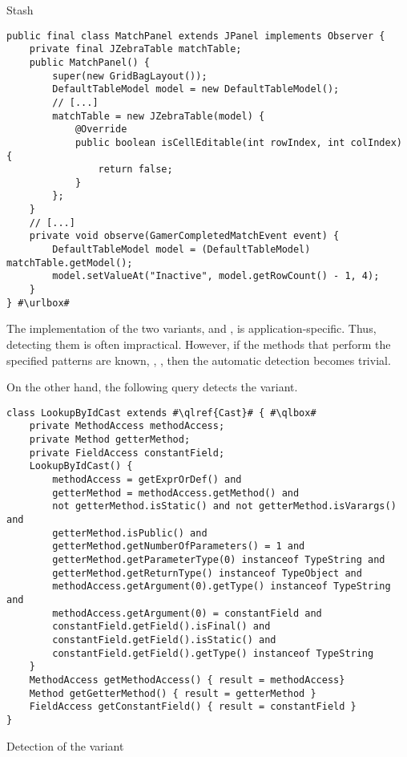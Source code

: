 \begin{pattern}{Stash}
\def\urlvar{http://bit.ly/ggp_org_ggp_base_2SAEXHu}
\begin{verbatim}
public final class MatchPanel extends JPanel implements Observer {
    private final JZebraTable matchTable;
    public MatchPanel() {
        super(new GridBagLayout());
        DefaultTableModel model = new DefaultTableModel();
        // [...]
        matchTable = new JZebraTable(model) {
            @Override
            public boolean isCellEditable(int rowIndex, int colIndex) {
                return false;
            }
        };
    }
    // [...]
    private void observe(GamerCompletedMatchEvent event) {
        DefaultTableModel model = (DefaultTableModel) matchTable.getModel();
        model.setValueAt("Inactive", model.getRowCount() - 1, 4);
    }
} #\urlbox#
\end{verbatim}

\detection{}
The implementation of the two variants,
 and , is application-specific.
Thus, detecting them is often impractical.
However, if the methods that perform the specified patterns are known,
\eg{}, , then the automatic detection becomes trivial.

On the other hand, the following query detects the  variant.

\begin{listing}
\begin{verbatim}
class LookupByIdCast extends #\qlref{Cast}# { #\qlbox#
	private MethodAccess methodAccess;
	private Method getterMethod;
	private FieldAccess constantField;
	LookupByIdCast() {
		methodAccess = getExprOrDef() and
		getterMethod = methodAccess.getMethod() and
		not getterMethod.isStatic() and not getterMethod.isVarargs() and
		getterMethod.isPublic() and
		getterMethod.getNumberOfParameters() = 1 and
		getterMethod.getParameterType(0) instanceof TypeString and
		getterMethod.getReturnType() instanceof TypeObject and
		methodAccess.getArgument(0).getType() instanceof TypeString and
		methodAccess.getArgument(0) = constantField and
		constantField.getField().isFinal() and
		constantField.getField().isStatic() and
		constantField.getField().getType() instanceof TypeString
	}
	MethodAccess getMethodAccess() { result = methodAccess}
	Method getGetterMethod() { result = getterMethod }
	FieldAccess getConstantField() { result = constantField }
}
\end{verbatim}
\caption{Detection of the  variant}
\end{listing}



\end{pattern}
